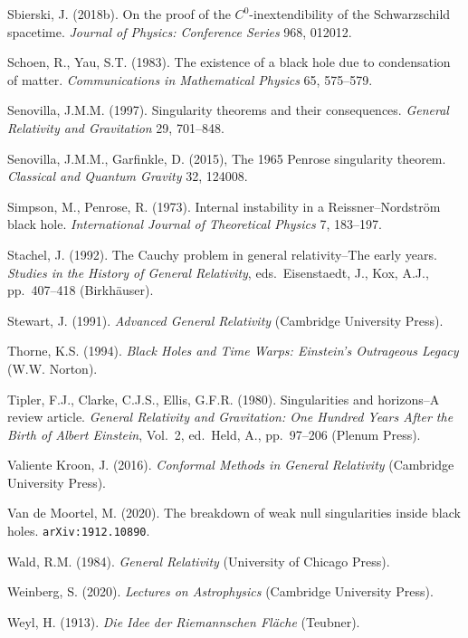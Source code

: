 \documentclass[11pt,a4paper]{article}
\begin{document}
\begin{small}
\begin{thebibliography}{99}
\item[] Sbierski, J. (2018b). On the proof of the $C^0$-inextendibility of the Schwarzschild spacetime. 
\emph{Journal of Physics: Conference Series} 968, 012012.
            \item[]    Schoen, R., Yau, S.T. (1983). The existence of a black hole due to condensation of matter.
              \emph{Communications in Mathematical Physics} 65, 575--579. 
   \item[] Senovilla, J.M.M.  (1997). Singularity theorems and their consequences.
\emph{General Relativity and Gravitation} 29, 701--848.
\item[] Senovilla, J.M.M.,  Garfinkle, D.  (2015), The 1965 Penrose singularity theorem.
\emph{Classical and Quantum Gravity} 32, 124008.      
\item[] Simpson, M., Penrose, R. (1973). Internal instability in a Reissner--Nordstr\"{o}m black hole.
\emph{International Journal of Theoretical Physics} 7, 183--197. 
   \item[]   Stachel, J. (1992). The Cauchy problem in general relativity--The early years.   
   \emph{Studies in the History of General Relativity}, eds.\   Eisenstaedt, J.,  Kox, A.J., 
   pp.\ 407--418 (Birkh\"{a}user). 
             \item[]  Stewart, J. (1991). \emph{Advanced General Relativity} (Cambridge University Press). 
            \item[]   Thorne, K.S. (1994). \emph{Black Holes and Time Warps: Einstein's Outrageous Legacy} (W.W. Norton).
            \item[] Tipler, F.J., Clarke, C.J.S., Ellis, G.F.R. (1980). Singularities and horizons--A review article.
 \emph{General Relativity and Gravitation: One Hundred Years After the Birth of Albert Einstein}, Vol.\ 2, ed.\
 Held, A., pp.\ 97--206 (Plenum Press). 
  \item[] Valiente Kroon, J. (2016). \emph{Conformal Methods in General Relativity} (Cambridge University Press). 
  \item[] Van de Moortel, M. (2020). The breakdown of weak null singularities inside black holes. \texttt{arXiv:1912.10890}.
  \item[]  Wald, R.M. (1984). \emph{General Relativity} (University of Chicago Press). 
  \item[]  Weinberg, S. (2020). \emph{Lectures on Astrophysics} (Cambridge University Press). 
    \item[] Weyl, H. (1913). \emph{Die Idee der Riemannschen Fl\"{a}che} (Teubner).   

\end{thebibliography}
\end{small}
\end{document}
